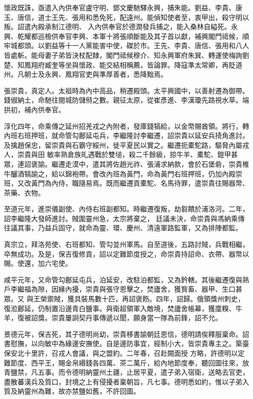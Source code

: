 \begin{pinyinscope}
 懷政既誅，亟遣入內供奉官盧守明、鄧文慶馳驛永興，捕朱能。劉益、李貴、康玉、唐信，道士王先、張用和悉免死，配遠州。能偵知使者至，衷甲出，殺守明以叛。詔遣內殿承制江德明、
 入內供奉官於德潤發兵捕之，能入桑林自縊死。永興、乾耀都巡檢供奉官李興、本軍十將張順斷能及其子首以獻，補興閣門祗候，順牢城都頭。以劉益等十一人黨能害中使，磔於市。王先、李貴、唐信、張用和八人皆處斬。能母妻子弟皆決杖配隸，閣門祗候穆介、知永興軍府朱巽、轉運使梅詢劉楚、知鳳翔府臧奎等坐與懷政、能交結相稱薦，皆論罪。降寇準太常卿，再貶道州。凡朝士及永興、鳳翔官吏與準厚善者，悉降黜焉。



 張崇貴，真定人。太祖時為內中高品，稍遷殿頭。太平興國中，以善射遷為御帶。錢俶納土，命馳往閱城防儲偫之數。親征太原，從崔彥進、李漢瓊先路視水草。端拱初，補內供奉官。



 淳化四年，命乘傳之延州招羌戎之內附者，發庫錢犒給，以金幣賜酋領。將行，轉內班右班押班，就命管勾鄜延屯兵，李繼隆討李繼遷，詔崇貴以延安兵掎角進討。及擒趙保忠，留崇貴與石霸守綏州，徙平夏民以實之。繼遷扼橐駝路，驅脅內屬戎人，崇貴與田
 敏率熟倉族癿遇戰於雙塠，殺二千餘級，掠牛羊、橐駝、鎧甲甚眾，連詔褒諭。繼遷走漠中，遣其將佐趙光祚、張浦求納款，會於石堡砦，崇貴椎牛釃酒犒諭之，給以錦袍帶。會改內班為黃門，命為黃門右班押班，仍加內殿崇班，又改黃門為內侍，職隨易焉。既而繼遷貢橐駝、名馬待罪，遣崇貴往賜器幣、茶藥、衣物。



 至道元年，進崇儀副使、內侍右班副都知。時繼遷復叛，劫芻饋於浦洛河。二年，詔李繼隆大發師進討。賊圍靈州急，太宗將棄之，
 廷議未決，命崇貴與馮納乘傳往議其事，乃益兵固守，就命為靈、環、慶州、清遠軍路監軍，又為排陣都監。



 真宗立，拜洛苑使、右班都知、管勾並州軍馬。自至道後，五路討賊，兵戰相繼，卒無成功。及是，保吉復修貢，詔以定難節度授之，命崇貴持詔命、衣帶、器幣以賜。使還，加六宅使。



 咸平元年，又命管勾鄜延屯兵，泊延安，改駐泊都監，又為鈐轄。其後繼遷復與熟戶李繼福為隙，因緣內擾，崇貴與張守恩擊之，焚廬舍，獲貲畜、器甲、生口甚眾。又
 與王榮禦賊，獲具裝馬數十匹，再詔褒飭。四年，詔歸。俄領獎州刺史，復涖鄜延，仍制置沿邊青白鹽事。與衛超領軍入敵境，焚廬舍帳幕，獲廩糗、牛羊，復被詔獎。崇貴屢詗契丹事傳遞以聞，願身當一隊為前鋒，詔不允。



 景德元年，保吉死，其子德明尚幼，崇貴移書諭朝廷恩信，德明請俟釋服稟命。詔書慰撫，以向敏中為緣邊安撫使。自是邊防事宜，經制小大，皆崇貴專主之。築臺保安北十里許，召戎人會議，與之盟約。二年春，召赴闕面授
 方略，許德明以定難節度、西平王，賜金帛緡錢各四萬、茶二萬斤，給內地節度奉，聽回圖往來，放青鹽禁，凡五事。而令德明納靈州土疆，止居平夏，遣子弟入宿衛，送略去官吏，盡散蕃漢兵及質口，封境之上有侵擾者稟朝旨，凡七事。德明悉如約，惟以子弟入質及納靈州為難，故亦禁鹽如舊，不許回圖。




\end{pinyinscope}
